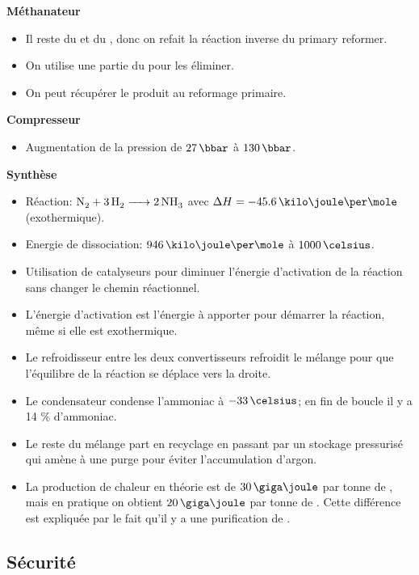 \textbf{Méthanateur}
\begin{itemize}
\item Il reste du  et du , donc on refait la réaction inverse du primary reformer.
\item On utilise une partie du  pour les éliminer.
\item On peut récupérer le  produit au reformage primaire.
\end{itemize}


\textbf{Compresseur}
\begin{itemize}
\item Augmentation de la pression de $27\,\bbar$ à $130\,\bbar$.
\end{itemize}

\textbf{Synthèse }
\begin{itemize}
\item Réaction: $\ce{N2 + 3H2  -> 2NH3}$ avec $\Delta H = -45.6\,\kilo\joule\per\mole$ (exothermique).
\item Energie de dissociation: $946\,\kilo\joule\per\mole$ à $1000\,\celsius$.
\item Utilisation de catalyseurs pour diminuer l'énergie d'activation de la réaction sans changer le chemin réactionnel.
\item L'énergie d'activation est l'énergie à apporter pour démarrer la réaction, même si elle est exothermique.
\item Le refroidisseur entre les deux convertisseurs refroidit le mélange pour que l'équilibre de la réaction se déplace vers la droite.
\item Le condensateur condense l'ammoniac à $-33\,\celsius$; en fin de boucle il y a
14 \% d'ammoniac.
\item Le reste du mélange part en recyclage en passant par un stockage pressurisé qui amène à une purge pour éviter l'accumulation d'argon.
\item La production de chaleur en théorie est de $30\,\giga\joule$ par tonne de , mais en pratique on obtient $20\,\giga\joule$ par tonne de .
Cette différence est expliquée par le fait qu'il y a une purification de .
\end{itemize}

\subsection{Sécurité}

